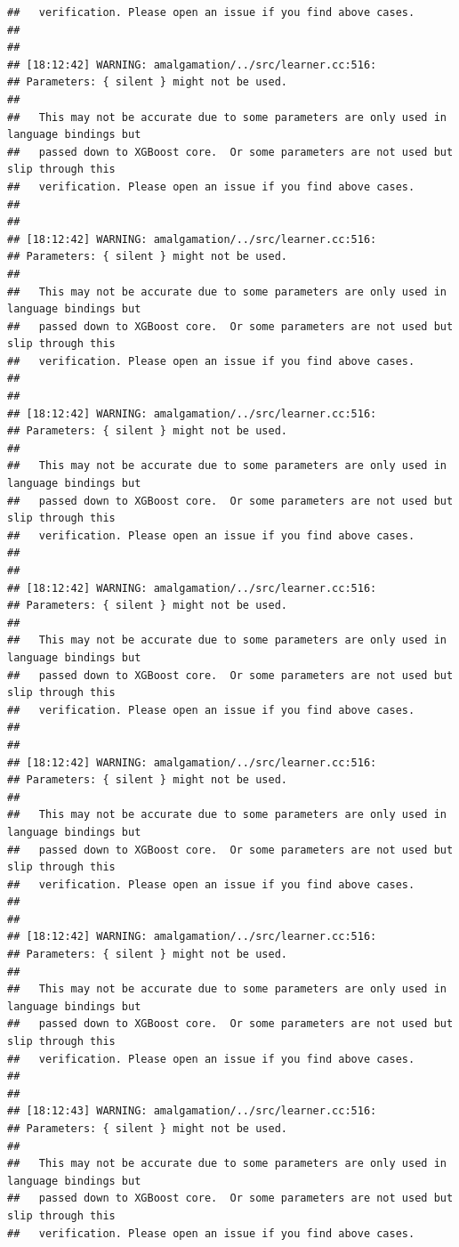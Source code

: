 \documentclass[AMS,STIX2COL]{WileyNJD-v2}\usepackage[]{graphicx}\usepackage[]{color}
\makeatletter
\newenvironment{kframe}{%
 \def\at@end@of@kframe{}%
 \ifinner\ifhmode%
  \def\at@end@of@kframe{\end{minipage}}%
  \begin{minipage}{\columnwidth}%
 \fi\fi%
 \def\FrameCommand##1{\hskip\@totalleftmargin \hskip-\fboxsep
 \colorbox{shadecolor}{##1}\hskip-\fboxsep
     \hskip-\linewidth \hskip-\@totalleftmargin \hskip\columnwidth}%
 \MakeFramed {\advance\hsize-\width
   \@totalleftmargin\z@ \linewidth\hsize
   \@setminipage}}%
 {\par\unskip\endMakeFramed%
 \at@end@of@kframe}
\newenvironment{knitrout}{}{} %
\makeatother
\begin{document}
\begin{knitrout}
\begin{kframe}
\begin{verbatim}
##   verification. Please open an issue if you find above cases.
## 
## 
## [18:12:42] WARNING: amalgamation/../src/learner.cc:516: 
## Parameters: { silent } might not be used.
## 
##   This may not be accurate due to some parameters are only used in language bindings but
##   passed down to XGBoost core.  Or some parameters are not used but slip through this
##   verification. Please open an issue if you find above cases.
## 
## 
## [18:12:42] WARNING: amalgamation/../src/learner.cc:516: 
## Parameters: { silent } might not be used.
## 
##   This may not be accurate due to some parameters are only used in language bindings but
##   passed down to XGBoost core.  Or some parameters are not used but slip through this
##   verification. Please open an issue if you find above cases.
## 
## 
## [18:12:42] WARNING: amalgamation/../src/learner.cc:516: 
## Parameters: { silent } might not be used.
## 
##   This may not be accurate due to some parameters are only used in language bindings but
##   passed down to XGBoost core.  Or some parameters are not used but slip through this
##   verification. Please open an issue if you find above cases.
## 
## 
## [18:12:42] WARNING: amalgamation/../src/learner.cc:516: 
## Parameters: { silent } might not be used.
## 
##   This may not be accurate due to some parameters are only used in language bindings but
##   passed down to XGBoost core.  Or some parameters are not used but slip through this
##   verification. Please open an issue if you find above cases.
## 
## 
## [18:12:42] WARNING: amalgamation/../src/learner.cc:516: 
## Parameters: { silent } might not be used.
## 
##   This may not be accurate due to some parameters are only used in language bindings but
##   passed down to XGBoost core.  Or some parameters are not used but slip through this
##   verification. Please open an issue if you find above cases.
## 
## 
## [18:12:42] WARNING: amalgamation/../src/learner.cc:516: 
## Parameters: { silent } might not be used.
## 
##   This may not be accurate due to some parameters are only used in language bindings but
##   passed down to XGBoost core.  Or some parameters are not used but slip through this
##   verification. Please open an issue if you find above cases.
## 
## 
## [18:12:43] WARNING: amalgamation/../src/learner.cc:516: 
## Parameters: { silent } might not be used.
## 
##   This may not be accurate due to some parameters are only used in language bindings but
##   passed down to XGBoost core.  Or some parameters are not used but slip through this
##   verification. Please open an issue if you find above cases.

\end{verbatim}
\end{kframe}
\end{knitrout}
\end{document}
